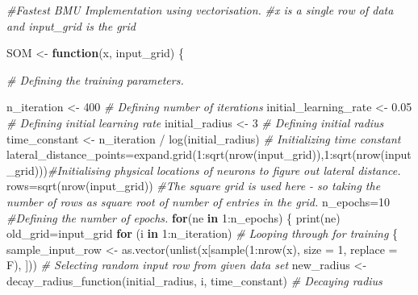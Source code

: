 \documentclass[
]{article}
\newenvironment{Shaded}{\begin{snugshade}}{\end{snugshade}}
\newcommand{\AttributeTok}[1]{\textcolor[rgb]{0.77,0.63,0.00}{#1}}
\newcommand{\CommentTok}[1]{\textcolor[rgb]{0.56,0.35,0.01}{\textit{#1}}}
\newcommand{\ControlFlowTok}[1]{\textcolor[rgb]{0.13,0.29,0.53}{\textbf{#1}}}
\newcommand{\DecValTok}[1]{\textcolor[rgb]{0.00,0.00,0.81}{#1}}
\newcommand{\FloatTok}[1]{\textcolor[rgb]{0.00,0.00,0.81}{#1}}
\newcommand{\FunctionTok}[1]{\textcolor[rgb]{0.00,0.00,0.00}{#1}}
\newcommand{\NormalTok}[1]{#1}
\newcommand{\OtherTok}[1]{\textcolor[rgb]{0.56,0.35,0.01}{#1}}
\newcommand{\SpecialCharTok}[1]{\textcolor[rgb]{0.00,0.00,0.00}{#1}}
\begin{document}
\begin{Shaded}
\begin{Highlighting}[]
\CommentTok{\#Fastest BMU Implementation using vectorisation.}
\CommentTok{\#x is a single row of data and input\_grid is the grid}


\NormalTok{SOM }\OtherTok{\textless{}{-}} \ControlFlowTok{function}\NormalTok{(x, input\_grid) \{}
  
  
\CommentTok{\# Defining the training parameters.}
  
\NormalTok{   n\_iteration }\OtherTok{\textless{}{-}} \DecValTok{400} \CommentTok{\# Defining number of iterations}
\NormalTok{  initial\_learning\_rate }\OtherTok{\textless{}{-}} \FloatTok{0.05} \CommentTok{\# Defining initial learning rate}
\NormalTok{  initial\_radius }\OtherTok{\textless{}{-}} \DecValTok{3} \CommentTok{\# Defining initial radius}
\NormalTok{  time\_constant }\OtherTok{\textless{}{-}}\NormalTok{ n\_iteration }\SpecialCharTok{/} \FunctionTok{log}\NormalTok{(initial\_radius) }\CommentTok{\# Initializing time constant}
\NormalTok{  lateral\_distance\_points}\OtherTok{=}\FunctionTok{expand.grid}\NormalTok{(}\DecValTok{1}\SpecialCharTok{:}\FunctionTok{sqrt}\NormalTok{(}\FunctionTok{nrow}\NormalTok{(input\_grid)),}\DecValTok{1}\SpecialCharTok{:}\FunctionTok{sqrt}\NormalTok{(}\FunctionTok{nrow}\NormalTok{(input\_grid)))}\CommentTok{\#Initialising physical locations of neurons to figure out lateral distance.}
\NormalTok{  rows}\OtherTok{=}\FunctionTok{sqrt}\NormalTok{(}\FunctionTok{nrow}\NormalTok{(input\_grid)) }\CommentTok{\#The square grid is used here {-} so taking the number of rows as square root of number of entries in the grid.}
\NormalTok{  n\_epochs}\OtherTok{=}\DecValTok{10} \CommentTok{\#Defining the number of epochs.}
  \ControlFlowTok{for}\NormalTok{(ne }\ControlFlowTok{in} \DecValTok{1}\SpecialCharTok{:}\NormalTok{n\_epochs)}
\NormalTok{  \{}
    \FunctionTok{print}\NormalTok{(ne)}
\NormalTok{    old\_grid}\OtherTok{=}\NormalTok{input\_grid}
    \ControlFlowTok{for}\NormalTok{ (i }\ControlFlowTok{in} \DecValTok{1}\SpecialCharTok{:}\NormalTok{n\_iteration) }\CommentTok{\# Looping through for training}
\NormalTok{    \{}
\NormalTok{      sample\_input\_row }\OtherTok{\textless{}{-}} \FunctionTok{as.vector}\NormalTok{(}\FunctionTok{unlist}\NormalTok{(x[}\FunctionTok{sample}\NormalTok{(}\DecValTok{1}\SpecialCharTok{:}\FunctionTok{nrow}\NormalTok{(x), }\AttributeTok{size =} \DecValTok{1}\NormalTok{, }\AttributeTok{replace =}\NormalTok{ F), ])) }\CommentTok{\# Selecting random input row from given data set}
\NormalTok{      new\_radius }\OtherTok{\textless{}{-}} \FunctionTok{decay\_radius\_function}\NormalTok{(initial\_radius, i, time\_constant) }\CommentTok{\# Decaying radius}

\end{Highlighting}
\end{Shaded}
\end{document}
